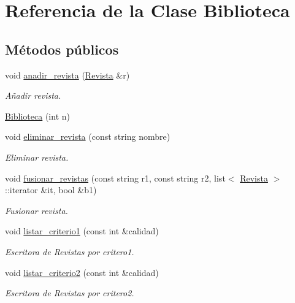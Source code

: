 \hypertarget{class_biblioteca}{\section{Referencia de la Clase Biblioteca}
\label{class_biblioteca}
}
\subsection*{Métodos públicos}
\begin{DoxyCompactItemize}
\item 
void \hyperlink{class_biblioteca_ac95f8ebef5693712c51ab157632b4a27}{anadir\-\_\-revista} (\hyperlink{class_revista}{Revista} \&r)
\begin{DoxyCompactList}\small\item\em Añadir revista. \end{DoxyCompactList}\item 
\hyperlink{class_biblioteca_a442743666a699393ac7ec7ee5d5a33ee}{Biblioteca} (int n)
\item 
void \hyperlink{class_biblioteca_a903cc3f25beff06e4d59b90968890d4f}{eliminar\-\_\-revista} (const string nombre)
\begin{DoxyCompactList}\small\item\em Eliminar revista. \end{DoxyCompactList}\item 
void \hyperlink{class_biblioteca_a44ee151b8e8b0630f3f6023ebdfe6930}{fusionar\-\_\-revistas} (const string r1, const string r2, list$<$ \hyperlink{class_revista}{Revista} $>$\-::iterator \&it, bool \&b1)
\begin{DoxyCompactList}\small\item\em Fusionar revista. \end{DoxyCompactList}\item 
void \hyperlink{class_biblioteca_a05a04c7765610370488f01036d3fadb6}{listar\-\_\-criterio1} (const int \&calidad)
\begin{DoxyCompactList}\small\item\em Escritora de Revistas por critero1. \end{DoxyCompactList}\item 
void \hyperlink{class_biblioteca_ae27dab12407d26d0dfd162ccd3301cc7}{listar\-\_\-criterio2} (const int \&calidad)
\begin{DoxyCompactList}\small\item\em Escritora de Revistas por critero2. \end{DoxyCompactList}\item 

\end{DoxyCompactItemize}
